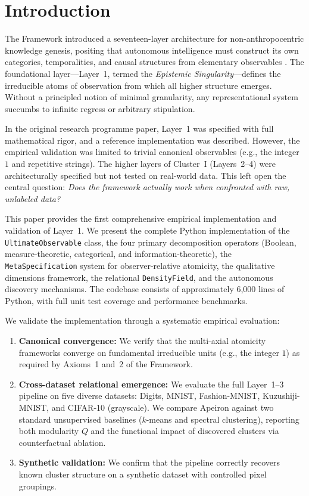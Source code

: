 \section{Introduction}
\label{sec:introduction}

The \Apeiron{} Framework introduced a seventeen-layer architecture for non-anthropocentric knowledge genesis, positing that autonomous intelligence must construct its own categories, temporalities, and causal structures from elementary observables \cite{beniers2026apeiron}. The foundational layer---Layer~1, termed the \emph{Epistemic Singularity}---defines the irreducible atoms of observation from which all higher structure emerges. Without a principled notion of minimal granularity, any representational system succumbs to infinite regress or arbitrary stipulation.

In the original research programme paper, Layer~1 was specified with full mathematical rigor, and a reference implementation was described. However, the empirical validation was limited to trivial canonical observables (e.g., the integer $1$ and repetitive strings). The higher layers of Cluster~I (Layers~2--4) were architecturally specified but not tested on real-world data. This left open the central question: \emph{Does the \Apeiron{} framework actually work when confronted with raw, unlabeled data?}

This paper provides the first comprehensive empirical implementation and validation of Layer~1. We present the complete Python implementation of the \texttt{UltimateObservable} class, the four primary decomposition operators (Boolean, measure-theoretic, categorical, and information-theoretic), the \texttt{MetaSpecification} system for observer-relative atomicity, the qualitative dimensions framework, the relational \texttt{DensityField}, and the autonomous discovery mechanisms. The codebase consists of approximately 6,000 lines of Python, with full unit test coverage and performance benchmarks.

We validate the implementation through a systematic empirical evaluation:

\begin{enumerate}
    \item \textbf{Canonical convergence:} We verify that the multi-axial atomicity frameworks converge on fundamental irreducible units (e.g., the integer $1$) as required by Axioms~1 and~2 of the \Apeiron{} Framework.
    
    \item \textbf{Cross-dataset relational emergence:} We evaluate the full Layer~1--3 pipeline on five diverse datasets: Digits, MNIST, Fashion-MNIST, Kuzushiji-MNIST, and CIFAR-10 (grayscale). We compare Apeiron against two standard unsupervised baselines ($k$-means and spectral clustering), reporting both modularity $Q$ and the functional impact of discovered clusters via counterfactual ablation.
    
    \item \textbf{Synthetic validation:} We confirm that the pipeline correctly recovers known cluster structure on a synthetic dataset with controlled pixel groupings.
\end{enumerate}

